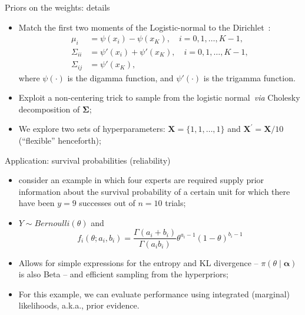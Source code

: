 \begin{frame}{Priors on the weights: details}
 \begin{itemize}
\item Match the first two moments of the Logistic-normal to the Dirichlet~\citep{aitchson1980}:
  \begin{align*}
 \label{eq:momentmatching}
 \mu_i & = \psi(x_i) - \psi(x_K), \quad i=0,1,\ldots,K-1, \\
 \Sigma_{ii} & = \psi'(x_i) + \psi'(x_K), \quad i=0,1,\ldots,K-1, \\
 \Sigma_{ij} & = \psi'(x_K),
\end{align*}
where $\psi(\cdot)$ is the digamma function, and $\psi'(\cdot)$ is the trigamma function.
\item Exploit a non-centering trick to sample from the logistic normal~\textit{via} Cholesky decomposition of $\boldsymbol \Sigma$;  
\item We explore two sets of hyperparameters: $\boldsymbol X = \{1, 1, \ldots, 1\}$ and $\boldsymbol X^\prime = \boldsymbol X/10$ (``flexible'' henceforth);
 \end{itemize}
\end{frame}
\begin{frame}{Application: survival probabilities (reliability)}
 \begin{itemize}
  \item \cite{savchuk1994} consider an example in which four experts are required supply prior information about the survival probability of
a certain unit for which there have been $y = 9$ successes out of $n = 10$ trials;
  \item $Y\sim Bernoulli(\theta)$ and
  \[f_i(\theta;a_i, b_i) = \frac{\Gamma(a_i + b_i)}{\Gamma(a_i b_i)} \theta^{a_i-1}(1-\theta)^{b_i-1}\]
  \item Allows for simple expressions for the entropy and KL divergence -- $\pi(\theta \mid \boldsymbol\alpha)$ is also Beta -- and efficient sampling from the hyperpriors; 
  \item For this example, we can evaluate performance using integrated (marginal) likelihoods, a.k.a., prior evidence.
 \end{itemize}
\end{frame}
